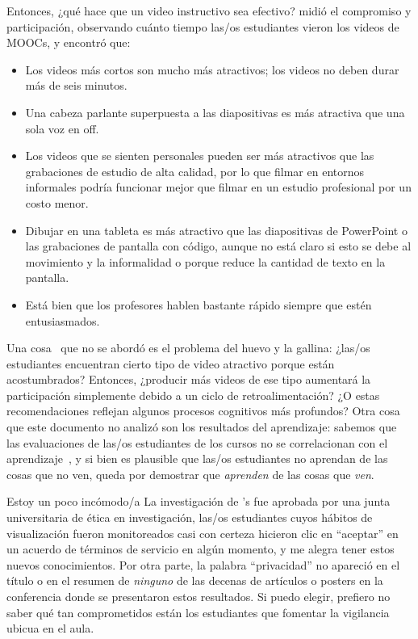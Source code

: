 Entonces, ¿qué hace que un video instructivo sea efectivo?
\cite{Guo2014} midió el compromiso y participación, observando cuánto tiempo las/os estudiantes vieron los videos de MOOCs,
y encontró que:

\begin{itemize}

\item
  Los videos más cortos son mucho más atractivos; los videos no deben durar más de seis minutos.

\item
  Una cabeza parlante superpuesta a las diapositivas es más atractiva que una sola voz en off.

\item
  Los videos que se sienten personales pueden ser más atractivos que las grabaciones de estudio de alta calidad,
  por lo que filmar en entornos informales podría funcionar mejor que filmar en un estudio profesional por un costo menor.

\item
  Dibujar en una tableta es más atractivo que las diapositivas de PowerPoint o las grabaciones de pantalla con código,
  aunque no está claro si esto se debe al movimiento y la informalidad
  o porque reduce la cantidad de texto en la pantalla.

\item
  Está bien que los profesores hablen bastante rápido siempre que estén entusiasmados.

\end{itemize}

Una cosa~\cite{Guo2014} que no se abordó es el problema del huevo y la gallina:
¿las/os estudiantes encuentran cierto tipo de video atractivo porque están acostumbrados?
Entonces, ¿producir más videos de ese tipo aumentará la participación simplemente debido a un ciclo de retroalimentación?
¿O estas recomendaciones reflejan algunos procesos cognitivos más profundos?
Otra cosa que este documento no analizó son los resultados del aprendizaje:
sabemos que las evaluaciones de las/os estudiantes de los cursos no se correlacionan con el aprendizaje~\cite{Star2014,Uttl2017},
y si bien es plausible que las/os estudiantes no aprendan de las cosas que no ven,
queda por demostrar que \emph{aprenden} de las cosas que \emph{ven}.

\begin{aside}{Estoy un poco incómodo/a}
  La investigación de \cite{Guo2014}'s fue aprobada por una junta universitaria de ética en investigación,
  las/os estudiantes cuyos hábitos de visualización fueron monitoreados casi con certeza hicieron clic en ``aceptar''
  en un acuerdo de términos de servicio en algún momento,
  y me alegra tener estos nuevos conocimientos.
  Por otra parte,
  la palabra ``privacidad'' no apareció en el título o en el resumen
  de \emph{ninguno} de las decenas de artículos o posters en la conferencia donde se presentaron estos resultados.
  Si puedo elegir,
  prefiero no saber qué tan comprometidos están los estudiantes
  que fomentar la vigilancia ubicua en el aula.
\end{aside}


